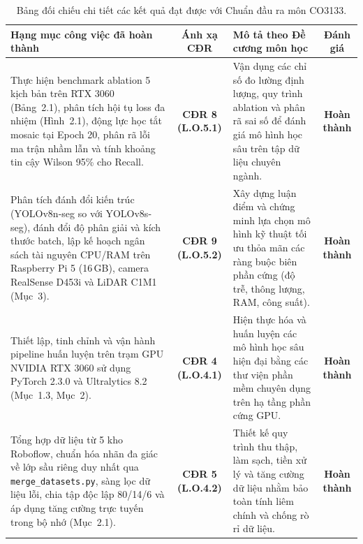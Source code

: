 \documentclass[12pt,a4paper]{article}
\begin{document}
\begin{table}[htbp]
\centering
\small
\caption{Bảng đối chiếu chi tiết các kết quả đạt được với Chuẩn đầu ra môn CO3133.}
\label{tab:clo_mapping}
\begin{tabularx}{\textwidth}{>{\raggedright\arraybackslash}p{6.5cm} c X c}
\toprule
\textbf{Hạng mục công việc đã hoàn thành} & \textbf{Ánh xạ CĐR} & \textbf{Mô tả theo Đề cương môn học} & \textbf{Đánh giá} \\
\midrule
Thực hiện benchmark ablation 5 kịch bản trên RTX 3060 (Bảng~2.1), phân tích hội tụ loss đa nhiệm (Hình~2.1), động lực học tắt mosaic tại Epoch 20, phân rã lỗi ma trận nhầm lẫn và tính khoảng tin cậy Wilson 95\% cho Recall. & \textbf{CĐR 8 (L.O.5.1)} & Vận dụng các chỉ số đo lường định lượng, quy trình ablation và phân rã sai số để đánh giá mô hình học sâu trên tập dữ liệu chuyên ngành. & \textbf{Hoàn thành} \\
\addlinespace
Phân tích đánh đổi kiến trúc (YOLOv8n-seg so với YOLOv8s-seg), đánh đổi độ phân giải và kích thước batch, lập kế hoạch ngân sách tài nguyên CPU/RAM trên Raspberry Pi 5 (16\,GB), camera RealSense D453i và LiDAR C1M1 (Mục~3). & \textbf{CĐR 9 (L.O.5.2)} & Xây dựng luận điểm và chứng minh lựa chọn mô hình kỹ thuật tối ưu thỏa mãn các ràng buộc biên phần cứng (độ trễ, thông lượng, RAM, công suất). & \textbf{Hoàn thành} \\
\addlinespace
Thiết lập, tinh chỉnh và vận hành pipeline huấn luyện trên trạm GPU NVIDIA RTX 3060 sử dụng PyTorch 2.3.0 và Ultralytics 8.2 (Mục~1.3, Mục~2). & \textbf{CĐR 4 (L.O.4.1)} & Hiện thực hóa và huấn luyện các mô hình học sâu hiện đại bằng các thư viện phần mềm chuyên dụng trên hạ tầng phần cứng GPU. & \textbf{Hoàn thành} \\
\addlinespace
Tổng hợp dữ liệu từ 5 kho Roboflow, chuẩn hóa nhãn đa giác về lớp sầu riêng duy nhất qua \texttt{merge\_datasets.py}, sàng lọc dữ liệu lỗi, chia tập độc lập 80/14/6 và áp dụng tăng cường trực tuyến trong bộ nhớ (Mục~2.1). & \textbf{CĐR 5 (L.O.4.2)} & Thiết kế quy trình thu thập, làm sạch, tiền xử lý và tăng cường dữ liệu nhằm bảo toàn tính liêm chính và chống rò rỉ dữ liệu. & \textbf{Hoàn thành} \\
\bottomrule
\end{tabularx}
\end{table}
\end{document}

